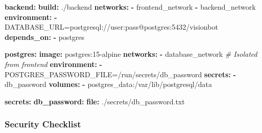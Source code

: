 \documentclass[
]{article}
\newenvironment{Shaded}{\begin{snugshade}}{\end{snugshade}}
\newcommand{\AttributeTok}[1]{\textcolor[rgb]{0.13,0.29,0.53}{#1}}
\newcommand{\CommentTok}[1]{\textcolor[rgb]{0.56,0.35,0.01}{\textit{#1}}}
\newcommand{\FunctionTok}[1]{\textcolor[rgb]{0.13,0.29,0.53}{\textbf{#1}}}
\newcommand{\KeywordTok}[1]{\textcolor[rgb]{0.13,0.29,0.53}{\textbf{#1}}}
\begin{document}
\begin{Shaded}
\begin{Highlighting}[]
\AttributeTok{  }\FunctionTok{backend}\KeywordTok{:}
\AttributeTok{    }\FunctionTok{build}\KeywordTok{:}\AttributeTok{ ./backend}
\AttributeTok{    }\FunctionTok{networks}\KeywordTok{:}
\AttributeTok{      }\KeywordTok{{-}}\AttributeTok{ frontend\_network}
\AttributeTok{      }\KeywordTok{{-}}\AttributeTok{ backend\_network}
\AttributeTok{    }\FunctionTok{environment}\KeywordTok{:}
\AttributeTok{      }\KeywordTok{{-}}\AttributeTok{ DATABASE\_URL=postgresql://user:pass@postgres:5432/visionbot}
\AttributeTok{    }\FunctionTok{depends\_on}\KeywordTok{:}
\AttributeTok{      }\KeywordTok{{-}}\AttributeTok{ postgres}

\AttributeTok{  }\FunctionTok{postgres}\KeywordTok{:}
\AttributeTok{    }\FunctionTok{image}\KeywordTok{:}\AttributeTok{ postgres:15{-}alpine}
\AttributeTok{    }\FunctionTok{networks}\KeywordTok{:}
\AttributeTok{      }\KeywordTok{{-}}\AttributeTok{ database\_network}\CommentTok{  \# Isolated from frontend}
\AttributeTok{    }\FunctionTok{environment}\KeywordTok{:}
\AttributeTok{      }\KeywordTok{{-}}\AttributeTok{ POSTGRES\_PASSWORD\_FILE=/run/secrets/db\_password}
\AttributeTok{    }\FunctionTok{secrets}\KeywordTok{:}
\AttributeTok{      }\KeywordTok{{-}}\AttributeTok{ db\_password}
\AttributeTok{    }\FunctionTok{volumes}\KeywordTok{:}
\AttributeTok{      }\KeywordTok{{-}}\AttributeTok{ postgres\_data:/var/lib/postgresql/data}

\FunctionTok{secrets}\KeywordTok{:}
\AttributeTok{  }\FunctionTok{db\_password}\KeywordTok{:}
\AttributeTok{    }\FunctionTok{file}\KeywordTok{:}\AttributeTok{ ./secrets/db\_password.txt}
\end{Highlighting}
\end{Shaded}

\hypertarget{security-checklist}{%
\subsubsection{Security Checklist}\label{security-checklist}}
\end{document}
